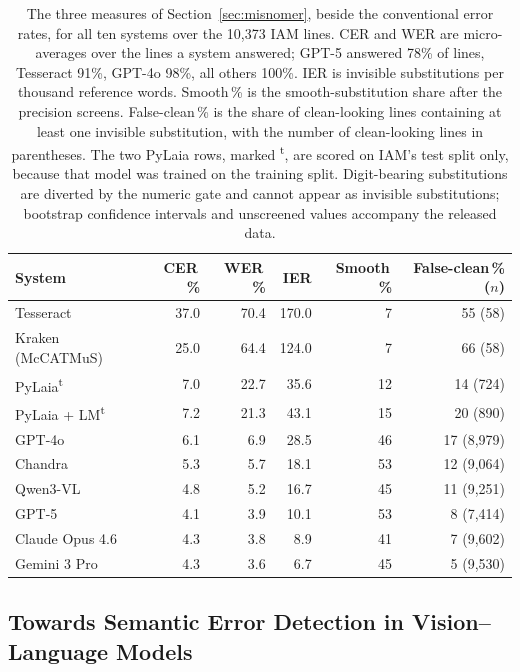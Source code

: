 \documentclass{anthology-ch}         %
\begin{document}
\begin{table}[t]
\centering
\begin{tabular}{l r r r r r}
\toprule
System & CER\,\% & WER\,\% & IER & Smooth\,\% & False-clean\,\% ($n$) \\
\midrule
Tesseract & 37.0 & 70.4 & 170.0 & 7 & 55 (58) \\
Kraken (McCATMuS) & 25.0 & 64.4 & 124.0 & 7 & 66 (58) \\
\midrule
PyLaia\textsuperscript{t} & 7.0 & 22.7 & 35.6 & 12 & 14 (724) \\
PyLaia + LM\textsuperscript{t} & 7.2 & 21.3 & 43.1 & 15 & 20 (890) \\
\midrule
GPT-4o & 6.1 & 6.9 & 28.5 & 46 & 17 (8,979) \\
Chandra & 5.3 & 5.7 & 18.1 & 53 & 12 (9,064) \\
Qwen3-VL & 4.8 & 5.2 & 16.7 & 45 & 11 (9,251) \\
GPT-5 & 4.1 & 3.9 & 10.1 & 53 & 8 (7,414) \\
Claude Opus 4.6 & 4.3 & 3.8 & 8.9 & 41 & 7 (9,602) \\
Gemini 3 Pro & 4.3 & 3.6 & 6.7 & 45 & 5 (9,530) \\
\bottomrule
\end{tabular}
\caption{The three measures of Section~\ref{sec:misnomer}, beside the conventional error rates, for all ten systems over the 10,373 IAM lines. CER and WER are micro-averages over the lines a system answered; GPT-5 answered 78\% of lines, Tesseract 91\%, GPT-4o 98\%, all others 100\%. IER is invisible substitutions per thousand reference words. Smooth\,\% is the smooth-substitution share after the precision screens. False-clean\,\% is the share of clean-looking lines containing at least one invisible substitution, with the number of clean-looking lines in parentheses. The two PyLaia rows, marked \textsuperscript{t}, are scored on IAM's test split only, because that model was trained on the training split. Digit-bearing substitutions are diverted by the numeric gate and cannot appear as invisible substitutions; bootstrap confidence intervals and unscreened values accompany the released data.}\label{tab:census}
\end{table}

\subsection{Towards Semantic Error Detection in Vision--Language Models}
\end{document}
